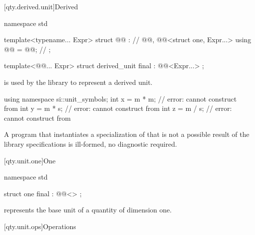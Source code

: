 [qty.derived.unit]{Derived}

\begin{codeblock}
namespace std {

template<typename... Expr>
struct @@ :              // \expos
    @@,
    @@<struct one, Expr...> {
  using @@ = @@;  // \expos
};

template<@@... Expr>
struct derived_unit final : @@<Expr...> {};

}
\end{codeblock}

\pnum
{} is used by the library
to represent a derived unit.
\begin{example}
\begin{codeblock}
using namespace si::unit_symbols;
int x = m * m;  // error: cannot construct from 
int y = m * s;  // error: cannot construct from 
int z = m / s;  // error: cannot construct from 
\end{codeblock}
\end{example}
A program that instantiates a specialization of 
that is not a possible result of the library specifications
is ill-formed, no diagnostic required.

[qty.unit.one]{One}

\begin{codeblock}
namespace std {

struct one final : @@<> {};

}
\end{codeblock}

\pnum
{} represents the base unit of a quantity of dimension one.

[qty.unit.ops]{Operations}

